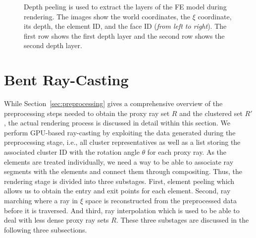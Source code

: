 \documentclass[journal]{vgtc}                %
\begin{document}
\begin{figure}[t]
    \caption{Depth peeling is used to extract the layers of the FE model during rendering. The images show the world coordinates, the $\xi$ coordinate, its depth, the element ID, and the face ID ({\it from left to right}). The first row shows the first depth layer and the second row shows the second depth layer.}
    \label{fig:depthpeeling}
\end{figure}
%
%
%
\section{Bent Ray-Casting}\label{sec:rendering}
While Section~\ref{sec:preprocessing} gives a comprehensive overview of the preprocessing steps needed to obtain the proxy ray set $R$ and the clustered set $R'$, the actual rendering process is discussed in detail within this section. We perform GPU-based ray-casting by exploiting the data generated during the preprocessing stage, i.e., all cluster representatives as well as a list storing the associated cluster ID with the rotation angle $\theta$ for each proxy ray. As the elements are treated individually, we need a way to be able to associate ray segments with the elements and connect them through compositing. Thus, the rendering stage is divided into three substages. First, element peeling which allows us to obtain the entry and exit points for each element. Second, ray marching where a ray in $\xi$ space is reconstructed from the preprocessed data before it is traversed. And third, ray interpolation which is used to be able to deal with less dense proxy ray sets $R$. These three substages are discussed in the following three subsections.
%
%
%
\end{document}
